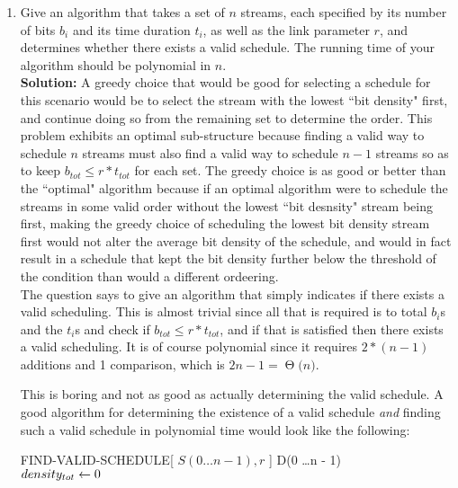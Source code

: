 \documentclass[11pts]{article}
\newcommand{\BigTheta}[1]{\ensuremath{\operatorname{\Theta}\bigl(#1\bigr)}}
\begin{document}
\begin{enumerate}
\begin{enumerate}
  \item Give an algorithm that takes a set of $n$ streams, each specified
  by its number of bits $b_i$ and its time duration $t_i$, as well as
  the link parameter $r$, and determines whether there exists a
  valid schedule. The running time of your algorithm should
  be polynomial in $n$. \\

  \textbf{Solution:} A greedy choice that would be good for selecting a
  schedule for this scenario would be to select the stream with the lowest
  ``bit density" first, and continue doing so from the remaining set to
  determine the order. This problem exhibits an optimal sub-structure because
  finding a valid way to schedule $n$ streams must also find a valid way to
  schedule $n - 1$ streams so as to keep $b_{tot} \le r*t_{tot}$ for each
  set. The greedy choice is as good or better than the ``optimal" algorithm
  because if an optimal algorithm were to schedule the streams in some valid
  order without the lowest ``bit desnsity" stream being first, making the
  greedy choice of scheduling the lowest bit density stream first would not
  alter the average bit density of the schedule, and would in fact result
  in a schedule that kept the bit density further below the threshold of
  the condition than would a different ordeering. \\
  
  The question says to give an algorithm that simply indicates if there exists
  a valid scheduling. This is almost trivial since all that is required is
  to total $b_i$s and the $t_i$s and check if $b_{tot} \le r*t_{tot}$, and
  if that is satisfied then there exists a valid scheduling. It is of
  course polynomial since it requires $2 * (n - 1)$ additions and 1
  comparison, which is $2n -1 = \BigTheta{n}$.

  This is boring and not as good as actually determining the valid schedule.
  A good algorithm for determining the existence of a valid schedule \emph{and}
  finding such a valid schedule in polynomial time would look like the
  following: \\

\begin{algorithm}{FIND-VALID-SCHEDULE}[ $S( 0 \dots n - 1 ), r$ ]{
   }
  D(0 \dots n - 1) \\
  $density_{tot} \mathrel{\leftarrow} 0$ \\


\end{algorithm}
\end{enumerate}
\end{enumerate}
\end{document}
